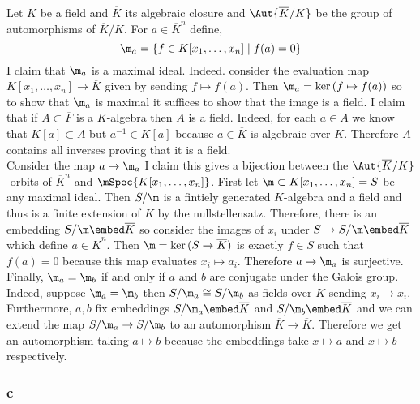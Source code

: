 \documentclass[12pt]{article}
\begin{document}
Let $K$ be a field and $\overline{K}$ its algebraic closure and $\Aut{\overline{K}/K}$ be the group of automorphisms of $\overline{K}/K$. For $a \in \overline{K}^n$ define,
\[ \m_a = \{ f \in K[x_1, \dots, x_n] \mid f(a) = 0 \} \]
I claim that $\m_a$ is a maximal ideal. Indeed. consider the evaluation map $K[x_1, \dots, x_n] \to \overline{K}$ given by sending $f \mapsto f(a)$. Then $\m_a = \ker{(f \mapsto f(a))}$ so to show that $\m_a$ is maximal it suffices to show that the image is a field. I claim that if $A \subset \overline{F}$ is a $K$-algebra then $A$ is a field. Indeed, for each $a \in A$ we know that $K[a] \subset A$ but $a^{-1} \in K[a]$ because $a \in \overline{K}$ is algebraic over $K$. Therefore $A$ contains all inverses proving that it is a field. 
\bigskip\\
Consider the map $a \mapsto \m_a$ I claim this gives a bijection between the $\Aut{\overline{K}/K}$-orbits of $\overline{K}^n$ and $\mSpec{K[x_1, \dots, x_n]}$. First let $\m \subset K[x_1, \dots, x_n] = S$ be any maximal ideal. Then $S / \m$ is a fintiely generated $K$-algebra and a field and thus is a finite extension of $K$ by the nullstellensatz. Therefore, there is an embedding $S / \m \embed \overline{K}$ so consider the images of $x_i$ under $S \to S / \m \embed \overline{K}$ which define $a \in \overline{K}^n$. Then $\m = \ker{(S \to \overline{K})}$ is exactly $f \in S$ such that $f(a) = 0$ because this map evaluates $x_i \mapsto a_i$. Therefore $a \mapsto \m_a$ is surjective.
\bigskip\\
Finally, $\m_a = \m_b$ if and only if $a$ and $b$ are conjugate under the Galois group. Indeed, suppose $\m_a = \m_b$ then $S / \m_a \cong S / \m_b$ as fields over $K$ sending $x_i \mapsto x_i$. Furthermore, $a, b$ fix embeddings $S/\m_a \embed \overline{K}$ and $S/\m_b \embed \overline{K}$ and we can extend the map $S/\m_a \to S/\m_b$ to an automorphism $\overline{K} \to \overline{K}$. Therefore we get an automorphism taking $a \mapsto b$ because the embeddings take $x \mapsto a$ and $x \mapsto b$ respectively.

\subsubsection{c}
\end{document}
